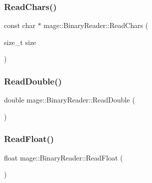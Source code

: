 \hypertarget{classmage_1_1_binary_reader_af1e0e4ab815e23c72ab65fd7c0748d3f}{}\label{classmage_1_1_binary_reader_af1e0e4ab815e23c72ab65fd7c0748d3f} 
\subsubsection{\texorpdfstring{Read\+Chars()}{ReadChars()}}
{\footnotesize\ttfamily const char $\ast$ mage\+::\+Binary\+Reader\+::\+Read\+Chars (\begin{DoxyParamCaption}\item[{size\+\_\+t}]{size }\end{DoxyParamCaption})\hspace{0.3cm}{\ttfamily [protected]}}

\hypertarget{classmage_1_1_binary_reader_aa9d54a457a85d6f488d818c0a3e56560}{}\label{classmage_1_1_binary_reader_aa9d54a457a85d6f488d818c0a3e56560} 
\subsubsection{\texorpdfstring{Read\+Double()}{ReadDouble()}}
{\footnotesize\ttfamily double mage\+::\+Binary\+Reader\+::\+Read\+Double (\begin{DoxyParamCaption}{ }\end{DoxyParamCaption})\hspace{0.3cm}{\ttfamily [protected]}}

\hypertarget{classmage_1_1_binary_reader_af18ab2185b7c766c2183ab54f4676d57}{}\label{classmage_1_1_binary_reader_af18ab2185b7c766c2183ab54f4676d57} 
\subsubsection{\texorpdfstring{Read\+Float()}{ReadFloat()}}
{\footnotesize\ttfamily float mage\+::\+Binary\+Reader\+::\+Read\+Float (\begin{DoxyParamCaption}{ }\end{DoxyParamCaption})\hspace{0.3cm}{\ttfamily [protected]}}

